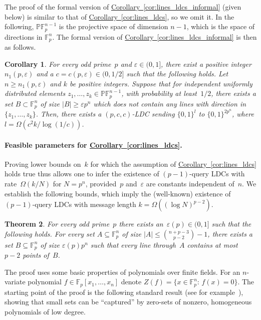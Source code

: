 \documentclass[11pt]{article}
\numberwithin{equation}{section}
\newtheorem{theorem}{Theorem}[section]
\newtheorem{corollary}[theorem]{Corollary}
\theoremstyle{definition}
\theoremstyle{plain}
\newcommand{\expref}[2]{\hyperref[#2]{#1~\ref{#2}}}
\newcommand{\bset}[1]{\{0,1\}^{#1}} %
\newcommand{\st}{:\,} %
\newcommand{\eps}{\varepsilon}
\newcommand{\F}{{\mathbb{F}}}
\newcommand{\PF}{{\mathbb{P}\mathbb{F}}}
\begin{document}
The proof of the formal version of \expref{Corollary}{cor:lines_ldcs_informal} (given below) is similar to that of \expref{Corollary}{cor:lines_ldcs}, so we omit it.
In the following, $\PF_p^{n-1}$ is the projective space of dimension $n-1$, which is the space of directions in $\F_p^n$.
The formal version of \expref{Corollary}{cor:lines_ldcs_informal} is then as follows.

\begin{corollary}\label{cor:forbidden_directions}
For every odd prime~$p$ and $\eps \in (0,1]$, there exist a positive integer $n_1(p,\eps)$ and a $c = c(p,\eps)\in (0,1/2]$ such that the following holds.
Let $n \geq n_1(p,\eps)$ and $k$ be positive integers.
Suppose that for independent uniformly distributed elements $z_1,\dots,z_k\in\PF_p^{n-1}$, with probability at least~$1/2$, there exists a set $B\subset \F_p^n$  of size $|B|\ge \eps p^n$ which does not contain any lines with direction in $\{z_1,\dots,z_k\}$.
Then, there exists a $(p, c,c)$-LDC sending $\bset{l}$ to $\bset{2p^n}$, where $l=\Omega(c^2 k/\log(1/c))$.
\end{corollary}


%
\paragraph{Feasible parameters for \expref{Corollary}{cor:lines_ldcs}.}

Proving lower bounds on~$k$ for which the assumption of \expref{Corollary}{cor:lines_ldcs} holds true thus allows one to infer the existence of $(p-1)$-query LDCs with rate~$\Omega(k/N)$ for $N = p^n$, provided~$p$ and~$\eps$ are constants independent of~$n$.
We establish the following bounds, which imply the (well-known) existence of $(p-1)$-query LDCs with message length $k = \Omega((\log N)^{p-2})$.

\begin{theorem}\label{thm:RM2}
For every odd prime~$p$ there exists an~$\eps(p)\in (0,1]$ such that the following holds.
For every set $A\subseteq \F_p^n$ of size $|A| \leq \binom{n+p-3}{p-2}-1$, there exists a set $B\subseteq \F_p^n$ of size $\eps(p) p^n$ such that every line through~$A$ contains at most~$p-2$ points of~$B$.
\end{theorem}

The proof uses some basic properties of polynomials over finite fields.
For an $n$-variate polynomial $f\in \F_p[x_1,\dots,x_n]$ denote $Z(f) = \{x\in\F_p^n\st f(x) = 0\}$.
The starting point of the proof is the following standard result (see for example~\cite{Tao:2014}), showing that small sets can be ``captured'' by zero-sets of nonzero, homogeneous polynomials of low degree.
\end{document}
